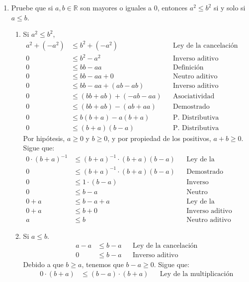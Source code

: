 \documentclass[11pt]{article}
\newcommand{\R}{\mathbb{R}}
\begin{document}
\begin{enumerate}
 \item Pruebe que si $a,b\in \R$ son mayores o iguales a $0$, entonces $a^2\leq b^2$ si y solo si $a\leq b$.
 \begin{enumerate}[label=\roman*)]
  \item Si $a^2\leq b^2$, \begin{align*}
   a^2 + (-a^2)&\leq b^2 +(-a^2)&& \text{Ley de la cancelación}\\
   0 &\leq b^2-a^2 && \text{Inverso aditivo}\\
   0 &\leq bb - aa && \text{Definición}\\
   0 &\leq bb - aa + 0 && \text{Neutro aditivo}\\
   0 &\leq bb - aa + (ab-ab) && \text{Inverso aditivo}\\
   0 &\leq (bb + ab) + (- ab - aa) && \text{Asociatividad}\\
   0 &\leq (bb + ab)-(ab+aa) && \text{Demostrado previamente}\\
   0 &\leq b(b+a)-a(b+a) && \text{P. Distributiva}\\
   0 &\leq (b+a)(b-a) && \text{P. Distributiva}
  \end{align*} Por hipótesis, $a\geq 0$ y $b\geq 0$, y por propiedad de los positivos, $a+b\geq 0$. Sigue que:\begin{align*}
   0 \cdot (b+a)^{-1}&\leq (b+a)^{-1}\cdot (b+a)(b-a) && \text{Ley de la cancelación}\\
   0 &\leq (b+a)^{-1}\cdot (b+a)(b-a) && \text{Demostrado anteriormente}\\
   0 &\leq 1 \cdot (b-a) && \text{Inverso multiplicativo}\\
   0 &\leq b-a && \text{Neutro multiplicativo}\\
   0 + a &\leq b-a+a && \text{Ley de la cancelación}\\
   0+a &\leq b+0 && \text{Inverso aditivo}\\
   a &\leq b && \text{Neutro aditivo}
  \end{align*}
  \item Si $a\leq b$. \begin{align*}
   a -a &\leq b-a && \text{Ley de la cancelación}\\
   0 &\leq b-a && \text{Inverso aditivo}
  \end{align*} Debido a que $b\geq a$, tenemos que $b-a\geq 0$. Sigue que: \begin{align*}
   0 \cdot (b+a) &\leq (b-a)\cdot (b+a) && \text{Ley de la multiplicación}\\

\end{align*}
\end{enumerate}
\end{enumerate}
\end{document}

